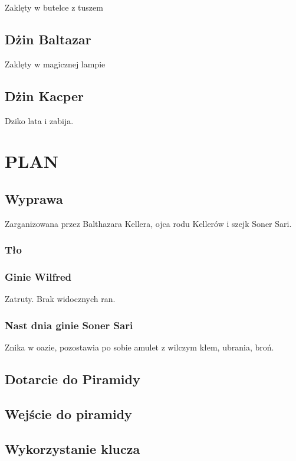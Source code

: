 \documentclass[11pt]{article}
\begin{document}
   Zaklęty w butelce z tuszem
\subsection*{Dżin Baltazar}
\label{sec-4.5}

   Zaklęty w magicznej lampie
\subsection*{Dżin Kacper}
\label{sec-4.6}

   Dziko lata i zabija.
\section*{PLAN}
\label{sec-5}

\subsection*{Wyprawa}
\label{sec-5.1}

   Zarganizowana przez Balthazara Kellera, ojca rodu Kellerów i
   szejk Soner Sari.
\subsubsection*{Tło}
\label{sec-5.1.1}

\subsubsection*{Ginie Wilfred}
\label{sec-5.1.2}

    Zatruty. Brak widocznych ran.
\subsubsection*{Nast dnia ginie Soner Sari}
\label{sec-5.1.3}

    Znika w oazie, pozostawia po sobie amulet z wilczym kłem,
    ubrania, broń.
\subsection*{Dotarcie do Piramidy}
\label{sec-5.2}

\subsection*{Wejście do piramidy}
\label{sec-5.3}

\subsection*{Wykorzystanie klucza}
\label{sec-5.4}
\end{document}
